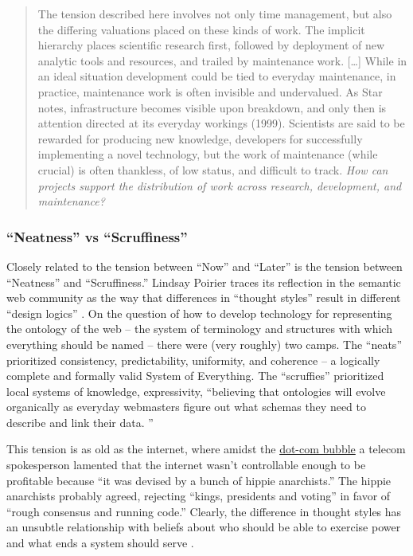 \documentclass[10pt]{article}
\begin{document}
\begin{multicols}{2}
\begin{quote}
The tension described here involves not only time management, but also
the differing valuations placed on these kinds of work. The implicit
hierarchy places scientific research first, followed by deployment of
new analytic tools and resources, and trailed by maintenance work.
{[}\ldots{]} While in an ideal situation development could be tied to
everyday maintenance, in practice, maintenance work is often invisible
and undervalued. As Star notes, infrastructure becomes visible upon
breakdown, and only then is attention directed at its everyday workings
(1999). Scientists are said to be rewarded for producing new knowledge,
developers for successfully implementing a novel technology, but the
work of maintenance (while crucial) is often thankless, of low status,
and difficult to track. \emph{How can projects support the distribution
of work across research, development, and maintenance?} \cite{ribesLongNowTechnology2009} 
\end{quote}

\hypertarget{neatness-vs-scruffiness}{%
\subsubsection{``Neatness'' vs
``Scruffiness''}\label{neatness-vs-scruffiness}}

Closely related to the tension between ``Now'' and ``Later'' is the
tension between ``Neatness'' and ``Scruffiness.'' Lindsay Poirier traces
its reflection in the semantic web community as the way that differences
in ``thought styles'' result in different ``design logics'' \cite{poirierTurnScruffyEthnographic2017} . On the question of how to
develop technology for representing the ontology of the web -- the
system of terminology and structures with which everything should be
named -- there were (very roughly) two camps. The ``neats'' prioritized
consistency, predictability, uniformity, and coherence -- a logically
complete and formally valid System of Everything. The ``scruffies''
prioritized local systems of knowledge, expressivity, ``believing that
ontologies will evolve organically as everyday webmasters figure out
what schemas they need to describe and link their data. \cite{poirierTurnScruffyEthnographic2017} ''

This tension is as old as the internet, where amidst the
\href{https://en.wikipedia.org/wiki/Dot-com_bubble}{dot-com bubble} a
telecom spokesperson lamented that the internet wasn't controllable
enough to be profitable because ``it was devised by a bunch of hippie
anarchists.'' \cite{hiltzikTamingWildWild2001}  The hippie
anarchists probably agreed, rejecting ``kings, presidents and voting''
in favor of ``rough consensus and running code.'' Clearly, the
difference in thought styles has an unsubtle relationship with beliefs
about who should be able to exercise power and what ends a system should
serve \cite{larsenPoliticalNatureTCP2012} .


\end{multicols}
\end{document}
